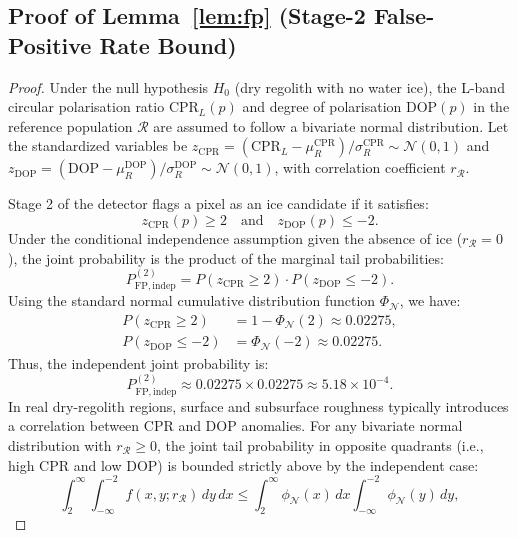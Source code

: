 \documentclass[10pt,conference]{IEEEtran}
\newcommand{\CPR}{\mathrm{CPR}}
\newcommand{\DOP}{\mathrm{DOP}}
\begin{document}
\subsection{Proof of Lemma~\ref{lem:fp} (Stage-2 False-Positive Rate Bound)}
\label{app:proof:lemma1}
\begin{proof}
Under the null hypothesis $H_0$ (dry regolith with no water ice), the L-band circular polarisation ratio $\CPR_L(p)$ and degree of polarisation $\DOP(p)$ in the reference population $\mathcal{R}$ are assumed to follow a bivariate normal distribution. Let the standardized variables be $z_{\CPR} = (\CPR_L - \mu_R^{\CPR})/\sigma_R^{\CPR} \sim \mathcal{N}(0,1)$ and $z_{\DOP} = (\DOP - \mu_R^{\DOP})/\sigma_R^{\DOP} \sim \mathcal{N}(0,1)$, with correlation coefficient $r_{\mathcal{R}}$.

Stage 2 of the detector flags a pixel as an ice candidate if it satisfies:
\begin{equation*}
z_{\CPR}(p) \ge 2 \quad \text{and} \quad z_{\DOP}(p) \le -2.
\end{equation*}
Under the conditional independence assumption given the absence of ice ($r_{\mathcal{R}} = 0$), the joint probability is the product of the marginal tail probabilities:
\begin{equation*}
P_{\mathrm{FP},\mathrm{indep}}^{(2)} = P(z_{\CPR} \ge 2) \cdot P(z_{\DOP} \le -2).
\end{equation*}
Using the standard normal cumulative distribution function $\Phi_{\mathcal{N}}$, we have:
\begin{align*}
P(z_{\CPR} \ge 2) &= 1 - \Phi_{\mathcal{N}}(2) \approx 0.02275, \\
P(z_{\DOP} \le -2) &= \Phi_{\mathcal{N}}(-2) \approx 0.02275.
\end{align*}
Thus, the independent joint probability is:
\begin{equation*}
P_{\mathrm{FP},\mathrm{indep}}^{(2)} \approx 0.02275 \times 0.02275 \approx 5.18 \times 10^{-4}.
\end{equation*}
In real dry-regolith regions, surface and subsurface roughness typically introduces a correlation between CPR and DOP anomalies. For any bivariate normal distribution with $r_{\mathcal{R}} \ge 0$, the joint tail probability in opposite quadrants (i.e., high CPR and low DOP) is bounded strictly above by the independent case:
\begin{equation*}
\int_{2}^{\infty} \int_{-\infty}^{-2} f(x, y; r_{\mathcal{R}}) \, dy \, dx \le \int_{2}^{\infty} \phi_{\mathcal{N}}(x) \, dx \int_{-\infty}^{-2} \phi_{\mathcal{N}}(y) \, dy,

\end{equation*}
\end{proof}
\end{document}
